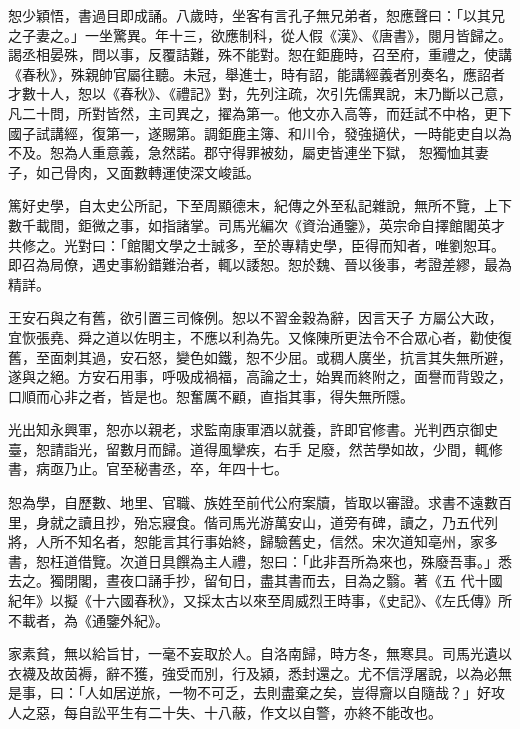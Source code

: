 \begin{pinyinscope}
 恕少穎悟，書過目即成誦。八歲時，坐客有言孔子無兄弟者，恕應聲曰：「以其兄之子妻之。」一坐驚異。年十三，欲應制科，從人假《漢》、《唐書》，閱月皆歸之。
 謁丞相晏殊，問以事，反覆詰難，殊不能對。恕在鉅鹿時，召至府，重禮之，使講《春秋》，殊親帥官屬往聽。未冠，舉進士，時有詔，能講經義者別奏名，應詔者才數十人，恕以《春秋》、《禮記》對，先列注疏，次引先儒異說，末乃斷以己意，凡二十問，所對皆然，主司異之，擢為第一。他文亦入高等，而廷試不中格，更下國子試講經，復第一，遂賜第。調鉅鹿主簿、和川令，發強擿伏，一時能吏自以為不及。恕為人重意義，急然諾。郡守得罪被劾，屬吏皆連坐下獄，
 恕獨恤其妻子，如己骨肉，又面數轉運使深文峻詆。



 篤好史學，自太史公所記，下至周顯德末，紀傳之外至私記雜說，無所不覽，上下數千載間，鉅微之事，如指諸掌。司馬光編次《資治通鑒》，英宗命自擇館閣英才共修之。光對曰：「館閣文學之士誠多，至於專精史學，臣得而知者，唯劉恕耳。即召為局僚，遇史事紛錯難治者，輒以諉恕。恕於魏、晉以後事，考證差繆，最為精詳。



 王安石與之有舊，欲引置三司條例。恕以不習金穀為辭，因言天子
 方屬公大政，宜恢張堯、舜之道以佐明主，不應以利為先。又條陳所更法令不合眾心者，勸使復舊，至面刺其過，安石怒，變色如鐵，恕不少屈。或稠人廣坐，抗言其失無所避，遂與之絕。方安石用事，呼吸成禍福，高論之士，始異而終附之，面譽而背毀之，口順而心非之者，皆是也。恕奮厲不顧，直指其事，得失無所隱。



 光出知永興軍，恕亦以親老，求監南康軍酒以就養，許即官修書。光判西京御史臺，恕請詣光，留數月而歸。道得風攣疾，右手
 足廢，然苦學如故，少間，輒修書，病亟乃止。官至秘書丞，卒，年四十七。



 恕為學，自歷數、地里、官職、族姓至前代公府案牘，皆取以審證。求書不遠數百里，身就之讀且抄，殆忘寢食。偕司馬光游萬安山，道旁有碑，讀之，乃五代列將，人所不知名者，恕能言其行事始終，歸驗舊史，信然。宋次道知亳州，家多書，恕枉道借覽。次道日具饌為主人禮，恕曰：「此非吾所為來也，殊廢吾事。」悉去之。獨閉閣，晝夜口誦手抄，留旬日，盡其書而去，目為之翳。著《五
 代十國紀年》以擬《十六國春秋》，又採太古以來至周威烈王時事，《史記》、《左氏傳》所不載者，為《通鑒外紀》。



 家素貧，無以給旨甘，一毫不妄取於人。自洛南歸，時方冬，無寒具。司馬光遺以衣襪及故茵褥，辭不獲，強受而別，行及潁，悉封還之。尤不信浮屠說，以為必無是事，曰：「人如居逆旅，一物不可乏，去則盡棄之矣，豈得齎以自隨哉？」好攻人之惡，每自訟平生有二十失、十八蔽，作文以自警，亦終不能改也。




\end{pinyinscope}
